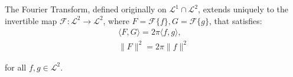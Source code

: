 \begin{theorem} \label{theo:Plancherel}
The Fourier Transform, defined originally on $\mathcal{L}^1 \cap \mathcal{L}^2$, extends uniquely to the invertible map $\mathcal{F}: \mathcal{L}^2 \to \mathcal{L}^2$, where $F = \mathcal{F}\{f\}, G = \mathcal{F}\{g\}$, that satisfies:
\begin{align*}
\langle F, G \rangle = 2\pi \langle f,g \rangle, \\
\|F\|^2  = 2\pi \|f\|^2
\end{align*}

for all $f,g \in \mathcal{L}^2$.
\end{theorem}